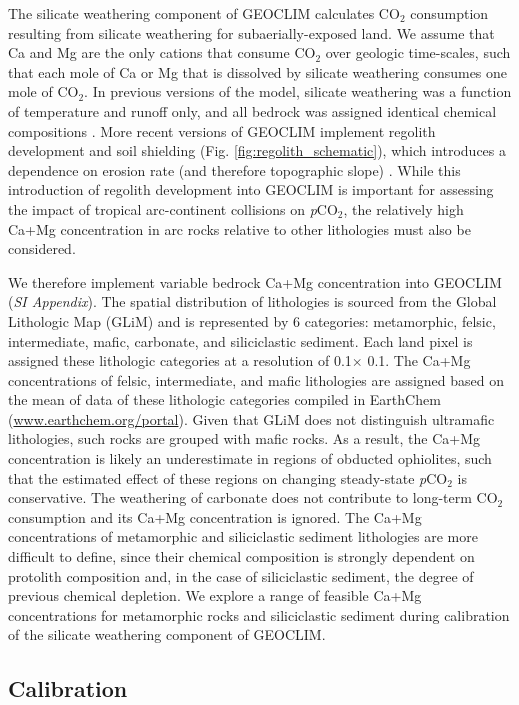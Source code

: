 \documentclass[9pt,twocolumn,twoside,lineno]{pnas-new}
\newcommand{\degrees}{\textdegree\xspace}
\newcommand{\pCOtwo}{\textit{p}CO$_{2}$\xspace}
\newcommand{\COtwo}{CO$_{2}$\xspace}
\newcommand{\SI}{\textit{SI Appendix}\xspace}
\begin{document}
The silicate weathering component of GEOCLIM calculates \COtwo consumption resulting from silicate weathering for subaerially-exposed land. We assume that Ca and Mg are the only cations that consume \COtwo over geologic time-scales, such that each mole of Ca or Mg that is dissolved by silicate weathering consumes one mole of \COtwo. In previous versions of the model, silicate weathering was a function of temperature and runoff only, and all bedrock was assigned identical chemical compositions \cite{Godderis2017c}. More recent versions of GEOCLIM implement regolith development and soil shielding (Fig. \ref{fig:regolith_schematic}), which introduces a dependence on erosion rate (and therefore topographic slope) \cite{Maffre2018a}. While this introduction of regolith development into GEOCLIM is important for assessing the impact of tropical arc-continent collisions on \pCOtwo, the relatively high Ca+Mg concentration in arc rocks relative to other lithologies must also be considered. 

We therefore implement variable bedrock Ca+Mg concentration into GEOCLIM (\SI). The spatial distribution of lithologies is sourced from the Global Lithologic Map (GLiM) \cite{Hartmann2012a} and is represented by 6 categories: metamorphic, felsic, intermediate, mafic, carbonate, and siliciclastic sediment. Each land pixel is assigned these lithologic categories at a resolution of 0.1\degrees $\times$ 0.1\degrees. The Ca+Mg concentrations of felsic, intermediate, and mafic lithologies are assigned based on the mean of data of these lithologic categories compiled in EarthChem (\url{www.earthchem.org/portal}). Given that GLiM does not distinguish ultramafic lithologies, such rocks are grouped with mafic rocks. As a result, the Ca+Mg concentration is likely an underestimate in regions of obducted ophiolites, such that the estimated effect of these regions on changing steady-state \pCOtwo is conservative. The weathering of carbonate does not contribute to long-term \COtwo consumption and its Ca+Mg concentration is ignored. The Ca+Mg concentrations of metamorphic and siliciclastic sediment lithologies are more difficult to define, since their chemical composition is strongly dependent on protolith composition and, in the case of siliciclastic sediment, the degree of previous chemical depletion. We explore a range of feasible Ca+Mg concentrations for metamorphic rocks and siliciclastic sediment during calibration of the silicate weathering component of GEOCLIM.

\subsection*{Calibration}
\end{document}
